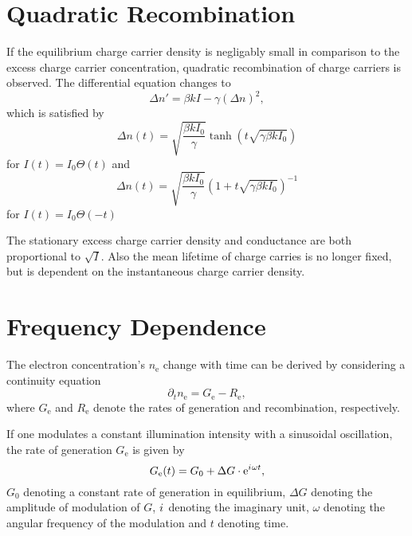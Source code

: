 \section{Quadratic Recombination}\label{sec:quad-recomb}
If the equilibrium charge carrier density is negligably small in comparison to the excess charge carrier concentration, quadratic recombination of charge carriers is observed.
The differential equation changes to
\begin{equation*}
	\Delta n' = \beta k I - \gamma (\Delta n)^2,
\end{equation*}
which is satisfied by
\begin{equation*}
	\Delta n (t) = \sqrt{\frac{\beta k I_0}{\gamma}} \tanh \left(t \sqrt{\gamma \beta k I_0} \right)
\end{equation*}
for $I(t) = I_0 \Theta (t)$ and
\begin{equation*}
	\Delta n (t) = \sqrt{\frac{\beta k I_0}{\gamma}} \left(1 + t \sqrt{\gamma \beta k I_0} \right)^{-1}
\end{equation*}
for $I(t) = I_0 \Theta (-t)$

The stationary excess charge carrier density and conductance are both proportional to $\sqrt{I}$.
Also the mean lifetime of charge carries is no longer fixed, but is dependent on the instantaneous charge carrier density.

\section{Frequency Dependence}
The electron concentration's $n_\text{e}$ change with time can be derived by considering a continuity equation
\begin{equation}\label{eq:cont_el}
	\partial_tn_\text{e} = G_\text{e} - R_\text{e},
\end{equation}
where $G_\text{e}$ and $R_\text{e}$ denote the rates of generation and recombination, respectively.

If one modulates a constant illumination intensity with a sinusoidal oscillation, the rate of generation $G_\text{e}$ is given by
\begin{equation}\label{eq:genrate}
	G_\text{e}(t) = G_0 + \Delta G\cdot\mathrm{e}^{{i\mkern1mu}\omega t},
\end{equation}
$G_0$ denoting a constant rate of generation in equilibrium, $\Delta G$ denoting the amplitude of modulation of $G$, ${i\mkern1mu}$ denoting the imaginary unit, $\omega$ denoting the angular frequency of the modulation and $t$ denoting time.

